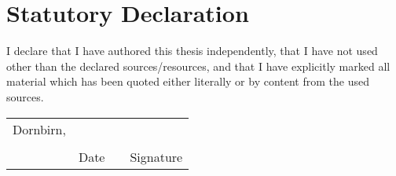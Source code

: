 
\section*{Statutory Declaration}

I declare that I have authored this thesis independently, that I have
not used other than the declared sources/resources, and that I have
explicitly marked all material which has been quoted either literally
or by content from the used sources.

\vfill

\newcommand{\mysignatureblock}[3]{%
  \begin{tabular}{llp{2em}l}
  #1 & \hspace{5cm}        & & \hspace{6cm} \\\cline{2-2}\cline{4-4}
     &                     & & \\[-3mm]
     & {\footnotesize #2}  & & {\footnotesize #3}
  \end{tabular}
}

\mysignatureblock{Dornbirn,}{Date}{Signature}

\vfill\vfill

\newpage


